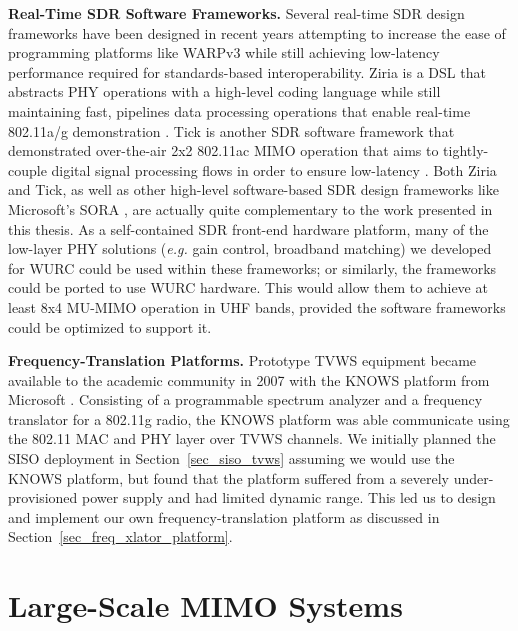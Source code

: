 	\textbf{Real-Time SDR Software Frameworks.}
	Several real-time \ac{SDR} design frameworks have been designed in recent years attempting to increase the ease of programming platforms like WARPv3 while still achieving low-latency performance required for standards-based interoperability.
	Ziria is a \ac{DSL} that abstracts \ac{PHY} operations with a high-level coding language while still maintaining fast, pipelines data processing operations that enable real-time 802.11a/g demonstration \cite{stewart2015ziria}.
	Tick is another \ac{SDR} software framework that demonstrated over-the-air 2x2 802.11ac \ac{MIMO} operation that aims to tightly-couple digital signal processing flows in order to ensure low-latency \cite{stewart2015ziria}.
	Both Ziria and Tick, as well as other high-level software-based \ac{SDR} design frameworks like Microsoft's SORA \cite{tan2011sora}, are actually quite complementary to the work presented in this thesis.
	As a self-contained \ac{SDR} front-end hardware platform, many of the low-layer \ac{PHY} solutions (\emph{e.g.} gain control, broadband matching) we developed for \ac{WURC} could be used within these frameworks; or similarly, the frameworks could be ported to use \ac{WURC} hardware.
	This would allow them to achieve at least 8x4 \ac{MU-MIMO} operation in UHF bands, provided the software frameworks could be optimized to support it.
	
	\textbf{Frequency-Translation Platforms.}
		Prototype \ac{TVWS} equipment became available to the academic community in 2007 with the KNOWS platform from Microsoft \cite{narlanka2007hardware, yuan2007knows, bahl2009white}.
	Consisting of a programmable spectrum analyzer and a frequency translator for a 802.11g radio, the KNOWS platform was able communicate using the 802.11 \ac{MAC} and \ac{PHY} layer over \ac{TVWS} channels.
	We initially planned the SISO deployment in Section~\ref{sec_siso_tvws} assuming we would use the KNOWS platform, but found that the platform suffered from a severely under-provisioned power supply and had limited dynamic range.
	This led us to design and implement our own frequency-translation platform as discussed in Section~\ref{sec_freq_xlator_platform}.


\section{Large-Scale \ac{MIMO} Systems}
\label{sec_related_mimo}

